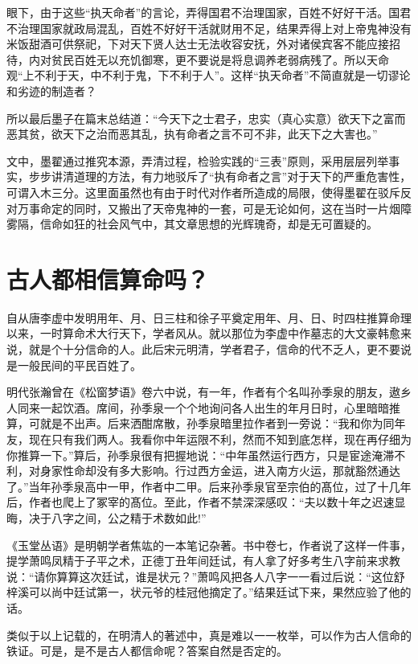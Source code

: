 \documentclass[a5paper,oneside,12pt]{ctexbook}
\begin{document}
{{眼下，由于这些“执天命者”的言论，弄得国君不治理国家，百姓不好好干活。国君不治理国家就政局混乱，百姓不好好干活就财用不足，结果弄得上对上帝鬼神没有米饭甜酒可供祭祀，下对天下贤人达士无法收容安抚，外对诸侯宾客不能应接招待，内对贫民百姓无以充饥御寒，更不要说是将息调养老弱病残了。所以天命观“上不利于天，中不利于鬼，下不利于人”。这样“执天命者”不简直就是一切谬论和劣迹的制造者？

所以最后墨子在篇末总结道：“今天下之士君子，忠实（真心实意）欲天下之富而恶其贫，欲天下之治而恶其乱，执有命者之言不可不非，此天下之大害也。”

文中，墨翟通过推究本源，弄清过程，检验实践的“三表”原则，采用层层列举事实，步步讲清道理的方法，有力地驳斥了“执有命者之言”对于天下的严重危害性，可谓入木三分。这里面虽然也有由于时代对作者所造成的局限，使得墨翟在驳斥反对万事命定的同时，又搬出了天帝鬼神的一套，可是无论如何，这在当时一片烟障雾隔，信命如狂的社会风气中，其文章思想的光辉瑰奇，却是无可置疑的。

\section{古人都相信算命吗？}

自从唐李虚中发明用年、月、日三柱和徐子平奠定用年、月、日、时四柱推算命理以来，一时算命术大行天下，学者风从。就以那位为李虚中作墓志的大文豪韩愈来说，就是个十分信命的人。此后宋元明清，学者君子，信命的代不乏人，更不要说是一般民间的平民百姓了。

明代张瀚曾在《松窗梦语》卷六中说，有一年，作者有个名叫孙季泉的朋友，遨乡人同来一起饮酒。席间，孙季泉一个个地询问各人出生的年月日时，心里暗暗推算，可就是不出声。后来洒酣席散，孙季泉暗里拉作者到一旁说：“我和你为同年友，现在只有我们两人。我看你中年运限不利，然而不知到底怎样，现在再仔细为你推算一下。”算后，孙季泉很有把握地说：“中年虽然运行西方，只是宦途淹滞不利，对身家性命却没有多大影响。行过西方金运，进入南方火运，那就豁然通达了。”当年孙季泉高中一甲，作者中二甲。后来孙季泉官至宗伯的髙位，过了十几年后，作者也爬上了冢宰的髙位。至此，作者不禁深深感叹：“夫以数十年之迟速显晦，决于八字之间，公之精于术数如此!”

《玉堂丛语》是明朝学者焦竑的一本笔记杂著。书中卷七，作者说了这样一件事，提学萧鸣凤精于子平之术，正德丁丑年间廷试，有人拿了好多考生八字前来求教说：“请你算算这次廷试，谁是状元？”萧鸣风把各人八字一一看过后说：“这位舒梓溪可以尚中廷试第一，状元爷的桂冠他摘定了。”结果廷试下来，果然应验了他的话。

类似于以上记载的，在明清人的著述中，真是难以一一枚举，可以作为古人信命的铁证。可是，是不是古人都信命呢？答案自然是否定的。

}}
\end{document}
